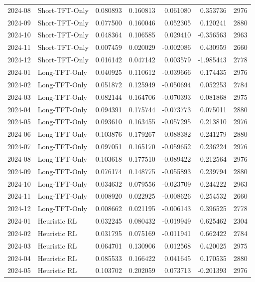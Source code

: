 \begin{tabular}{llrrrrr}
2024-08 & Short-TFT-Only & 0.080893 & 0.160813 & 0.061080 & 0.353736 & 2976 \\
2024-09 & Short-TFT-Only & 0.077500 & 0.160046 & 0.052305 & 0.120241 & 2880 \\
2024-10 & Short-TFT-Only & 0.048364 & 0.106585 & 0.029410 & -0.356563 & 2963 \\
2024-11 & Short-TFT-Only & 0.007459 & 0.020029 & -0.002086 & 0.430959 & 2660 \\
2024-12 & Short-TFT-Only & 0.016142 & 0.047142 & 0.003579 & -1.985443 & 2778 \\
2024-01 & Long-TFT-Only & 0.040925 & 0.110612 & -0.039666 & 0.174435 & 2976 \\
2024-02 & Long-TFT-Only & 0.051872 & 0.125949 & -0.050694 & 0.052253 & 2784 \\
2024-03 & Long-TFT-Only & 0.082144 & 0.164706 & -0.070393 & 0.081868 & 2975 \\
2024-04 & Long-TFT-Only & 0.094391 & 0.175744 & -0.073773 & 0.075011 & 2880 \\
2024-05 & Long-TFT-Only & 0.093610 & 0.163455 & -0.057295 & 0.213810 & 2976 \\
2024-06 & Long-TFT-Only & 0.103876 & 0.179267 & -0.088382 & 0.241279 & 2880 \\
2024-07 & Long-TFT-Only & 0.097051 & 0.165170 & -0.059652 & 0.236224 & 2976 \\
2024-08 & Long-TFT-Only & 0.103618 & 0.177510 & -0.089422 & 0.212564 & 2976 \\
2024-09 & Long-TFT-Only & 0.076174 & 0.148775 & -0.055893 & 0.239794 & 2880 \\
2024-10 & Long-TFT-Only & 0.034632 & 0.079556 & -0.023709 & 0.244222 & 2963 \\
2024-11 & Long-TFT-Only & 0.008920 & 0.022925 & -0.008626 & 0.254532 & 2660 \\
2024-12 & Long-TFT-Only & 0.008662 & 0.021195 & -0.006143 & 0.396525 & 2778 \\
2024-01 & Heuristic RL & 0.032245 & 0.080432 & -0.019949 & 0.625462 & 2304 \\
2024-02 & Heuristic RL & 0.031795 & 0.075169 & -0.011941 & 0.662422 & 2784 \\
2024-03 & Heuristic RL & 0.064701 & 0.130906 & 0.012568 & 0.420025 & 2975 \\
2024-04 & Heuristic RL & 0.085533 & 0.166422 & 0.041645 & 0.170535 & 2880 \\
2024-05 & Heuristic RL & 0.103702 & 0.202059 & 0.073713 & -0.201393 & 2976 \\

\end{tabular}
